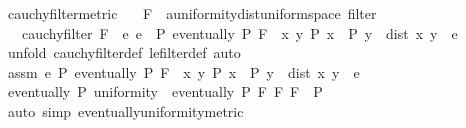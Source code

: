 \begin{isabellebody}
\endisatagML
{\isafoldML}%
%
\isadelimML
\isanewline
%
\endisadelimML
\isanewline
\isanewline
{}\isamarkupfalse%
\ cauchy{\isacharunderscore}{\kern0pt}filter{\isacharunderscore}{\kern0pt}metric{\isacharcolon}{\kern0pt}\isanewline
\ \ \ F\ {\isacharcolon}{\kern0pt}{\isacharcolon}{\kern0pt}\ {\isachardoublequoteopen}{\isacharprime}{\kern0pt}a{\isacharcolon}{\kern0pt}{\isacharcolon}{\kern0pt}{\isacharbraceleft}{\kern0pt}uniformity{\isacharunderscore}{\kern0pt}dist{\isacharcomma}{\kern0pt}uniform{\isacharunderscore}{\kern0pt}space{\isacharbraceright}{\kern0pt}\ filter{\isachardoublequoteclose}\isanewline
\ \ \ {\isachardoublequoteopen}cauchy{\isacharunderscore}{\kern0pt}filter\ F\ {\isasymlongleftrightarrow}\ {\isacharparenleft}{\kern0pt}{\isasymforall}e{\isachardot}{\kern0pt}\ e{\isachargreater}{\kern0pt}{}\ {\isasymlongrightarrow}\ {\isacharparenleft}{\kern0pt}{\isasymexists}P{\isachardot}{\kern0pt}\ eventually\ P\ F\ {\isasymand}\ {\isacharparenleft}{\kern0pt}{\isasymforall}x\ y{\isachardot}{\kern0pt}\ P\ x\ {\isasymand}\ P\ y\ {\isasymlongrightarrow}\ dist\ x\ y\ {\isacharless}{\kern0pt}\ e{\isacharparenright}{\kern0pt}{\isacharparenright}{\kern0pt}{\isacharparenright}{\kern0pt}{\isachardoublequoteclose}\isanewline
%
\isadelimproof
%
\endisadelimproof
%
\isatagproof
{}\isamarkupfalse%
\ {\isacharparenleft}{\kern0pt}unfold\ cauchy{\isacharunderscore}{\kern0pt}filter{\isacharunderscore}{\kern0pt}def\ le{\isacharunderscore}{\kern0pt}filter{\isacharunderscore}{\kern0pt}def{\isacharcomma}{\kern0pt}\ auto{\isacharparenright}{\kern0pt}\isanewline
\ \ \isamarkupfalse%
\ assm{\isacharcolon}{\kern0pt}\ {\isacartoucheopen}{\isasymforall}e{\isachargreater}{\kern0pt}{}{\isachardot}{\kern0pt}\ {\isasymexists}P{\isachardot}{\kern0pt}\ eventually\ P\ F\ {\isasymand}\ {\isacharparenleft}{\kern0pt}{\isasymforall}x\ y{\isachardot}{\kern0pt}\ P\ x\ {\isasymand}\ P\ y\ {\isasymlongrightarrow}\ dist\ x\ y\ {\isacharless}{\kern0pt}\ e{\isacharparenright}{\kern0pt}{\isacartoucheclose}\isanewline
\ \ \isamarkupfalse%
\ \isamarkupfalse%
\ {\isacartoucheopen}eventually\ P\ uniformity\ {\isasymLongrightarrow}\ eventually\ P\ {\isacharparenleft}{\kern0pt}F\ {\isasymtimes}\isactrlsub F\ F{\isacharparenright}{\kern0pt}{\isacartoucheclose}\ \ P\isanewline
\ \ \ \ \isamarkupfalse%
\ {\isacharparenleft}{\kern0pt}auto\ simp{\isacharcolon}{\kern0pt}\ eventually{\isacharunderscore}{\kern0pt}uniformity{\isacharunderscore}{\kern0pt}metric{\isacharparenright}{\kern0pt}\isanewline

\end{isabellebody}
